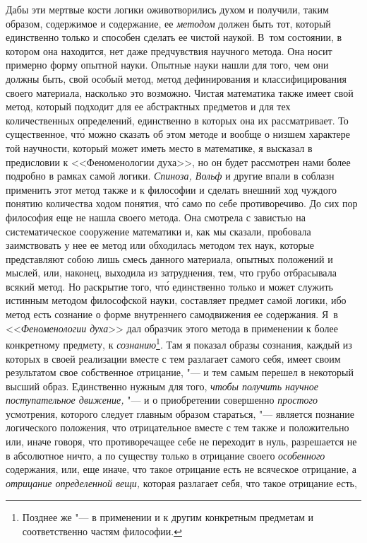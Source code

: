 Дабы эти мертвые кости логики оживотворились духом и получили, таким
образом, содержимое и содержание, ее {\em методом}
должен быть тот, который единственно только и способен сделать ее чистой
наукой. В~том состоянии, в котором она находится, нет даже предчувствия
научного метода. Она носит примерно форму опытной науки. Опытные науки
нашли для того, чем они должны быть, свой особый метод, метод дефинирования
и классифицирования своего материала, насколько это возможно. Чистая
математика также имеет свой метод, который подходит для ее абстрактных
предметов и для тех количественных определений, единственно в которых она
их рассматривает. То существенное, чт\'{о} можно сказать об этом методе и
вообще о низшем характере той научности, который может иметь место в
математике, я высказал в предисловии к <<Феноменологии духа>>, но он будет
рассмотрен нами более подробно в рамках самой логики.
{\em Спиноза, Вольф} и другие
впали в соблазн применить этот метод также и к философии и сделать внешний
ход чуждого понятию количества ходом понятия, чт\'{о} само по себе
противоречиво. До сих пор философия еще не нашла своего метода. Она
смотрела с завистью на систематическое сооружение математики и, как мы
сказали, пробовала заимствовать у нее ее метод или обходилась методом тех
наук, которые представляют собою лишь смесь данного материала, опытных
положений и мыслей, или, наконец, выходила из затруднения, тем, что грубо
отбрасывала всякий метод. Но раскрытие того, чт\'{о} единственно только и может
служить истинным методом философской науки, составляет предмет самой
логики, ибо метод есть сознание о форме внутреннего самодвижения ее
содержания. Я~в <<{\em Феноменологии духа}>> дал образчик
этого метода в применении к более конкретному предмету, к
{\em сознанию}\footnote{Позднее же "--- в применении
и к другим конкретным предметам и соответственно частям философии.}.
Там я показал образы сознания, каждый из которых в своей реализации вместе
с тем разлагает самого себя, имеет своим результатом свое собственное
отрицание, "--- и тем самым перешел в некоторый высший образ. Единственно
нужным для того, {\em чтобы получить научное
поступательное движение,} "--- и о приобретении совершенно
{\em простого} усмотрения, которого следует главным
образом стараться, "--- является познание логического положения, что
отрицательное вместе с тем также и положительно или, иначе говоря, что
противоречащее себе не переходит в нуль, разрешается не в абсолютное ничто,
а по существу только в отрицание своего
{\em особенного} содержания, или, еще иначе, что такое
отрицание есть не всяческое отрицание, а {\em отрицание
определенной вещи,} которая разлагает себя, что такое отрицание есть,
